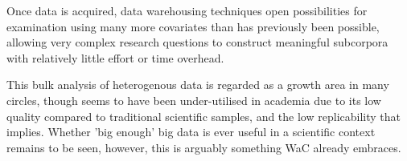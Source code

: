 Once data is acquired, data warehousing techniques open possibilities for examination using many more covariates than has previously been possible, allowing very complex research questions to construct meaningful subcorpora with relatively little effort or time overhead.

This bulk analysis of heterogenous data is regarded as a growth area in many circles, though seems to have been under-utilised in academia due to its low quality compared to traditional scientific samples, and the low replicability that implies.  Whether 'big enough' big data is ever useful in a scientific context remains to be seen, however, this is arguably something WaC already embraces.




